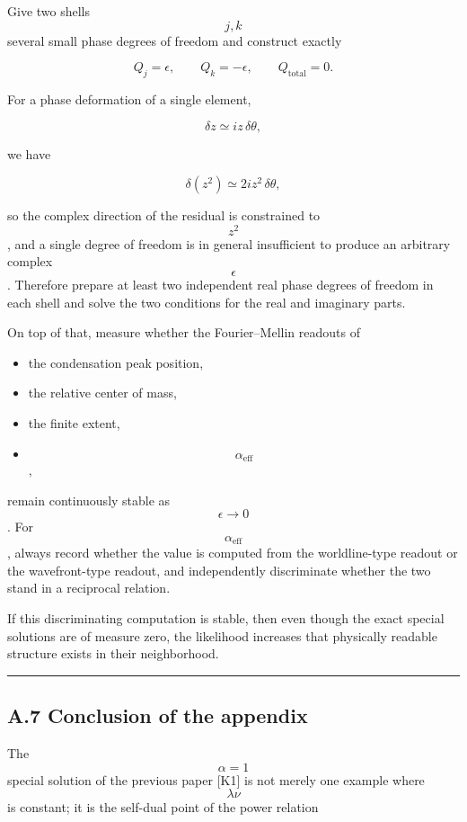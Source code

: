\documentclass[
  a4paper,
]{article}
\providecommand{\tightlist}{%
  \setlength{\itemsep}{0pt}\setlength{\parskip}{0pt}}
\begin{document}
Give two shells \[j,k\] several small phase degrees of freedom and
construct exactly

\[
Q_j=\epsilon,
\qquad
Q_k=-\epsilon,
\qquad
Q_{\mathrm{total}}=0.
\tag{A26}
\]

For a phase deformation of a single element,

\[
\delta z
\simeq
iz\,\delta\theta,
\]

we have

\[
\delta(z^2)
\simeq
2iz^2\,\delta\theta,
\tag{A27}
\]

so the complex direction of the residual is constrained to \[z^2\], and
a single degree of freedom is in general insufficient to produce an
arbitrary complex \[\epsilon\]. Therefore prepare at least two
independent real phase degrees of freedom in each shell and solve the
two conditions for the real and imaginary parts.

On top of that, measure whether the Fourier--Mellin readouts of

\begin{itemize}
\tightlist
\item
  the condensation peak position,
\item
  the relative center of mass,
\item
  the finite extent,
\item
  \[\alpha_{\mathrm{eff}}\],
\end{itemize}

remain continuously stable as \[\epsilon\to0\]. For
\[\alpha_{\mathrm{eff}}\], always record whether the value is computed
from the worldline-type readout or the wavefront-type readout, and
independently discriminate whether the two stand in a reciprocal
relation.

If this discriminating computation is stable, then even though the exact
special solutions are of measure zero, the likelihood increases that
physically readable structure exists in their neighborhood.

\begin{center}\rule{0.5\linewidth}{0.5pt}\end{center}

\subsection{A.7 Conclusion of the
appendix}\label{a.7-conclusion-of-the-appendix}

The \[\alpha=1\] special solution of the previous paper {[}K1{]} is not
merely one example where \[\lambda\nu\] is constant; it is the self-dual
point of the power relation
\end{document}
